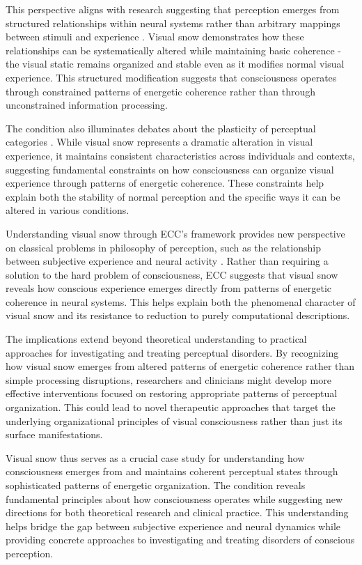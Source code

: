 This perspective aligns with research suggesting that perception emerges from structured relationships within neural systems rather than arbitrary mappings between stimuli and experience \cite{Thompson1995}. Visual snow demonstrates how these relationships can be systematically altered while maintaining basic coherence - the visual static remains organized and stable even as it modifies normal visual experience. This structured modification suggests that consciousness operates through constrained patterns of energetic coherence rather than through unconstrained information processing.

The condition also illuminates debates about the plasticity of perceptual categories \cite{VanBrakel1993}. While visual snow represents a dramatic alteration in visual experience, it maintains consistent characteristics across individuals and contexts, suggesting fundamental constraints on how consciousness can organize visual experience through patterns of energetic coherence. These constraints help explain both the stability of normal perception and the specific ways it can be altered in various conditions.

Understanding visual snow through ECC's framework provides new perspective on classical problems in philosophy of perception, such as the relationship between subjective experience and neural activity \cite{Tye2000}. Rather than requiring a solution to the hard problem of consciousness, ECC suggests that visual snow reveals how conscious experience emerges directly from patterns of energetic coherence in neural systems. This helps explain both the phenomenal character of visual snow and its resistance to reduction to purely computational descriptions.

The implications extend beyond theoretical understanding to practical approaches for investigating and treating perceptual disorders. By recognizing how visual snow emerges from altered patterns of energetic coherence rather than simple processing disruptions, researchers and clinicians might develop more effective interventions focused on restoring appropriate patterns of perceptual organization. This could lead to novel therapeutic approaches that target the underlying organizational principles of visual consciousness rather than just its surface manifestations.

Visual snow thus serves as a crucial case study for understanding how consciousness emerges from and maintains coherent perceptual states through sophisticated patterns of energetic organization. The condition reveals fundamental principles about how consciousness operates while suggesting new directions for both theoretical research and clinical practice. This understanding helps bridge the gap between subjective experience and neural dynamics while providing concrete approaches to investigating and treating disorders of conscious perception.
